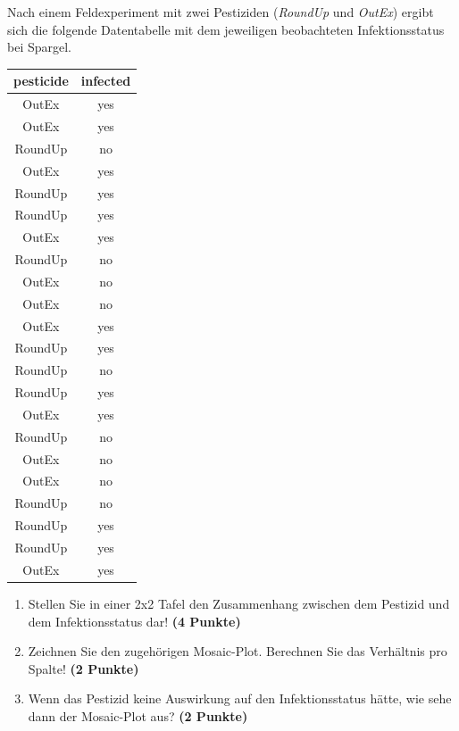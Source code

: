 \documentclass[a4paper, 9pt]{scrartcl}\usepackage[]{graphicx}\usepackage[]{xcolor}
\begin{document}
Nach einem Feldexperiment mit zwei Pestiziden (\textit{RoundUp} und
\textit{OutEx}) ergibt sich die folgende Datentabelle mit dem jeweiligen
beobachteten Infektionsstatus bei Spargel.

\begin{table}[!h]
\centering
\begin{tabular}{cc}
\toprule
pesticide & infected\\
\midrule
OutEx & yes\\
OutEx & yes\\
RoundUp & no\\
OutEx & yes\\
RoundUp & yes\\
\addlinespace
RoundUp & yes\\
OutEx & yes\\
RoundUp & no\\
OutEx & no\\
OutEx & no\\
\addlinespace
OutEx & yes\\
RoundUp & yes\\
RoundUp & no\\
RoundUp & yes\\
OutEx & yes\\
\addlinespace
RoundUp & no\\
OutEx & no\\
OutEx & no\\
RoundUp & no\\
RoundUp & yes\\
\addlinespace
RoundUp & yes\\
OutEx & yes\\
\bottomrule
\end{tabular}
\end{table}



\begin{enumerate}
\item Stellen Sie in einer 2x2 Tafel den Zusammenhang zwischen dem
  Pestizid und dem Infektionsstatus dar! \textbf{(4 Punkte)}
\item Zeichnen Sie den zugeh{\"o}rigen Mosaic-Plot. Berechnen Sie das
  Verh{\"a}ltnis pro Spalte! \textbf{(2 Punkte)}
\item Wenn das Pestizid keine Auswirkung auf den Infektionsstatus h{\"a}tte, wie
  sehe dann der Mosaic-Plot aus? \textbf{(2 Punkte)}
\end{enumerate} 
\clearpage
\end{document}
